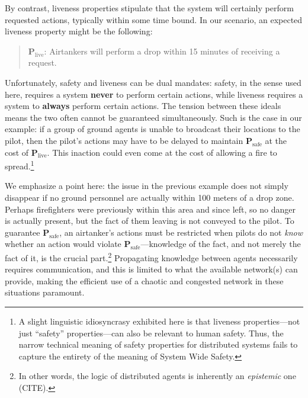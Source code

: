 \documentclass[]             %
{NASA}                       %
\theoremstyle{definition}
\begin{document}
\noindent By contrast, liveness properties stipulate that the system
will certainly perform requested actions, typically within some time
bound. In our scenario, an expected liveness property might be the
following:

\begin{quote}
    $\textbf{P}_\textrm{live}$:
    Airtankers will perform a drop within 15 minutes of receiving a request.
\end{quote}

Unfortunately, safety and liveness can be dual mandates: safety, in the
sense used here, requires a system \textbf{never} to perform certain
actions, while liveness requires a system to \textbf{always} perform
certain actions. The tension between these ideals means the two often
cannot be guaranteed simultaneously. Such is the case in our example: if
a group of ground agents is unable to broadcast their locations to the
pilot, then the pilot's actions may have to be delayed to maintain
\(\textbf{P}_\textrm{safe}\) at the cost of
\(\textbf{P}_\textrm{live}\). This inaction could even come at the cost
of allowing a fire to spread.\footnote{A slight linguistic idiosyncrasy
  exhibited here is that liveness properties---not just ``safety''
  properties---can also be relevant to human safety. Thus, the narrow
  technical meaning of safety properties for distributed systems fails
  to capture the entirety of the meaning of System Wide Safety.}

We emphasize a point here: the issue in the previous example does not
simply disappear if no ground personnel are actually within 100 meters
of a drop zone. Perhaps firefighters were previously within this area
and since left, so no danger is actually present, but the fact of them
leaving is not conveyed to the pilot. To guarantee
\(\textbf{P}_\textrm{safe}\), an airtanker's actions must be restricted
when pilots do not \emph{know} whether an action would violate
\(\textbf{P}_\textrm{safe}\)---knowledge of the fact, and not merely the
fact of it, is the crucial part.\footnote{In other words, the logic of
  distributed agents is inherently an \emph{epistemic} one (CITE).}
Propagating knowledge between agents necessarily requires communication,
and this is limited to what the available network(s) can provide, making
the efficient use of a chaotic and congested network in these situations
paramount.
\end{document}
